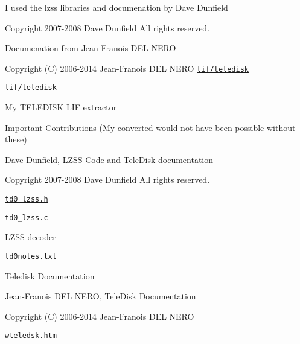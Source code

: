 \begin{DoxyItemize}
\item I used the lzss libraries and documenation by Dave Dunfield
\begin{DoxyItemize}
\item Copyright 2007-\/2008 Dave Dunfield All rights reserved.
\end{DoxyItemize}
\item Documenation from Jean-\/\+Franois D\+EL N\+E\+RO
\begin{DoxyItemize}
\item Copyright (C) 2006-\/2014 Jean-\/\+Franois D\+EL N\+E\+RO \href{lif/teledisk}{\tt lif/teledisk}
\end{DoxyItemize}
\item \href{lif/teledisk}{\tt lif/teledisk}
\begin{DoxyItemize}
\item My T\+E\+L\+E\+D\+I\+SK L\+IF extractor
\item Important Contributions (My converted would not have been possible without these)
\begin{DoxyItemize}
\item Dave Dunfield, L\+Z\+SS Code and Tele\+Disk documentation
\begin{DoxyItemize}
\item Copyright 2007-\/2008 Dave Dunfield All rights reserved.
\item \href{lif/teledisk/td0_lzss.h}{\tt td0\+\_\+lzss.\+h}
\item \href{lif/teledisk/td0_lzss.c}{\tt td0\+\_\+lzss.\+c}
\begin{DoxyItemize}
\item L\+Z\+SS decoder
\end{DoxyItemize}
\item \href{lif/teledisk/td0notes.txt}{\tt td0notes.\+txt}
\begin{DoxyItemize}
\item Teledisk Documentation
\end{DoxyItemize}
\end{DoxyItemize}
\item Jean-\/\+Franois D\+EL N\+E\+RO, Tele\+Disk Documentation
\begin{DoxyItemize}
\item Copyright (C) 2006-\/2014 Jean-\/\+Franois D\+EL N\+E\+RO
\begin{DoxyItemize}
\item \href{lif/teledisk/wteledsk.htm}{\tt wteledsk.\+htm}
\begin{DoxyItemize}

\end{DoxyItemize}
\end{DoxyItemize}
\end{DoxyItemize}
\end{DoxyItemize}
\end{DoxyItemize}
\end{DoxyItemize}
